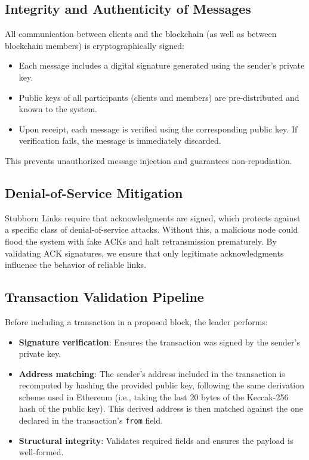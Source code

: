 \documentclass[runningheads]{llncs}
\begin{document}
\subsection{Integrity and Authenticity of Messages}

All communication between clients and the blockchain (as well as between blockchain members) is cryptographically signed:
\begin{itemize}
    \item Each message includes a digital signature generated using the sender’s private key.
    \item Public keys of all participants (clients and members) are pre-distributed and known to the system.
    \item Upon receipt, each message is verified using the corresponding public key. If verification fails, the message is immediately discarded.
\end{itemize}

This prevents unauthorized message injection and guarantees non-repudiation.

\subsection{Denial-of-Service Mitigation}

Stubborn Links require that acknowledgments are signed, which protects against a specific class of denial-of-service attacks. Without this, a malicious node could flood the system with fake ACKs and halt retransmission prematurely. By validating ACK signatures, we ensure that only legitimate acknowledgments influence the behavior of reliable links.

\subsection{Transaction Validation Pipeline}

Before including a transaction in a proposed block, the leader performs:
\begin{itemize}
    \item \textbf{Signature verification}: Ensures the transaction was signed by the sender’s private key.
    \item \textbf{Address matching}: The sender’s address included in the transaction is recomputed by hashing the provided public key, following the same derivation scheme used in Ethereum (i.e., taking the last 20 bytes of the Keccak-256 hash of the public key). This derived address is then matched against the one declared in the transaction’s \texttt{from} field.
    \item \textbf{Structural integrity}: Validates required fields and ensures the payload is well-formed.
\end{itemize}
\end{document}
